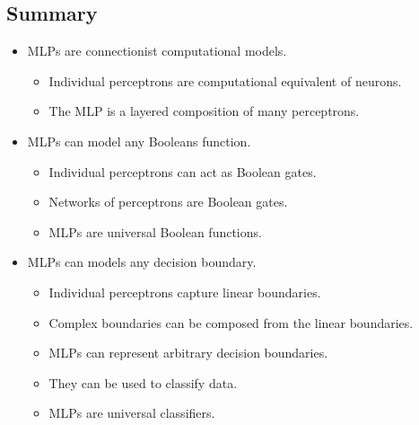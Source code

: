 \subsection{Summary}
\begin{itemize}
	\item MLPs are connectionist computational models.
	\begin{itemize}
		\item Individual perceptrons are computational equivalent of neurons.
		\item The MLP is a layered composition of many perceptrons.
	\end{itemize}
		\item MLPs can model any Booleans function.
	\begin{itemize}
		\item Individual perceptrons can act as Boolean gates.
		\item Networks of perceptrons are Boolean gates.
		\item MLPs are universal Boolean functions.
	\end{itemize}
		\item MLPs can models any decision boundary.
	\begin{itemize}
		\item Individual perceptrons capture linear boundaries.
		\item Complex boundaries can be composed from the linear boundaries.
		\item MLPs can represent arbitrary decision boundaries.
		\item They can be used to classify data.
		\item MLPs are universal classifiers.
	\end{itemize}
\end{itemize}